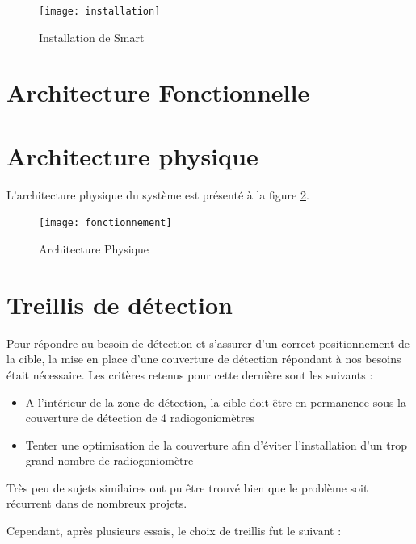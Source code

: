\begin{figure}[!h]
  \centering
  \texttt{[image: installation]}
  \caption{Installation de Smart}
  \label{fig:inst}
\end{figure}


\section{Architecture Fonctionnelle}

\section{Architecture physique}
\label{sec:phys}


L'architecture physique du système est présenté à la figure \ref{fig:arch_phys}.

\begin{figure}[!h]
  \centering
  \texttt{[image: fonctionnement]}
  \caption{Architecture Physique}
  \label{fig:arch_phys}
\end{figure}

\newpage
\section{Treillis de détection}

Pour répondre au besoin de détection et s’assurer d’un correct positionnement de la cible, la mise en
place d’une couverture de détection répondant à nos besoins était nécessaire. Les critères retenus
pour cette dernière sont les suivants :

\begin{itemize}
\item A l’intérieur de la zone de détection, la cible doit être en permanence sous la couverture de détection de 4 radiogoniomètres
\item Tenter une optimisation de la couverture afin d’éviter l’installation d’un trop grand
nombre de radiogoniomètre
\end{itemize}

Très peu de sujets similaires ont pu être trouvé bien que le problème soit récurrent dans de
nombreux projets.

Cependant, après plusieurs essais, le choix de treillis fut le suivant :

